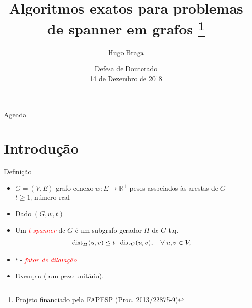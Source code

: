 \documentclass[dvipsnames]{beamer}
\title[Spanners]
      {Algoritmos exatos para problemas de spanner em grafos
      \thanks{Projeto financiado pela FAPESP (Proc. 2013/22875-9)}}
\author[hugo]
       {Hugo Braga}
\institute[USP]
{
 Instituto de Matem\'{a}tica e Estat\'{i}stica\\
 Universidade de S\~{a}o Paulo\\
 Orientadora: Prof. Yoshiko Wakabayashi
}
\date[Short Occasion]
{Defesa de Doutorado \\ 14 de Dezembro de 2018  }
\newcommand{\dist}{{\rm dist}}
\begin{document}
\begin{frame}
  \titlepage
\end{frame}

\begin{frame}{Agenda}
  \tableofcontents
\end{frame}

\section{Introdução}

\begin{frame}{Definição}

\begin{itemize}
 \item $G = (V,E)$  grafo conexo
   $w: E \to \mathbb{R}^+$ pesos associados às arestas de $G$\\
   $t \ge 1$, número real
   \item <2-> Dado $(G,w,t)$
 \item <3->Um \textcolor{red}{$t$-\emph{spanner}} de $G$ é um subgrafo gerador $H$
   de $G$ t.q.
\begin{equation*}
  \dist_{H}(u,v) \le t \cdot \dist_{G}(u,v), \quad \forall\;u,v \in V,
  \label{eq:def_spanner}
\end{equation*}


\item <4->$t$ - \textcolor{red}{\emph{fator de dilatação}}
\item <5->Exemplo (com peso unitário):

    
  

\end{itemize}
\end{frame}
\end{document}

